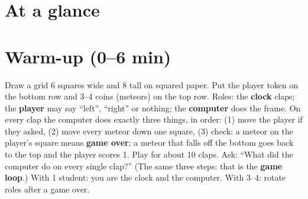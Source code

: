 \section{At a glance}
\begin{timeplan}
\end{timeplan}

\section{Warm-up (0--6 min)}
\begin{unplugged}
Draw a grid 6 squares wide and 8 tall on squared paper. Put the player token on the bottom row and 3--4 coins (meteors) on the top row.
Roles: the \textbf{clock} claps; the \textbf{player} may say \enquote{left}, \enquote{right} or nothing; the \textbf{computer} does the frame.
On every clap the computer does exactly three things, in order: (1) move the player if they asked, (2) move every meteor down one square,
(3) check: a meteor on the player's square means \textbf{game over}; a meteor that falls off the bottom goes back to the top and the player scores 1.
Play for about 10 claps. Ask: \enquote{What did the computer do on every single clap?} (The same three steps: that is the \textbf{game loop}.)
With 1 student: you are the clock and the computer. With 3--4: rotate roles after a game over.
\end{unplugged}

